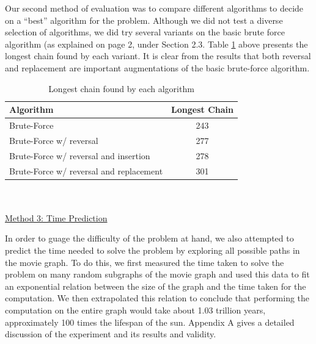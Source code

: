 \documentclass[11pt,english]{article}
\begin{document}
Our second method of evaluation was to compare different algorithms to
decide on a ``best'' algorithm for the problem. Although we did not test a
diverse selection of algorithms, we did try several variants on the basic
brute force algorithm (as explained on page 2, under Section 2.3. Table
\ref{tab:algos} above presents the longest chain found by each variant. It is
clear from the results that both reversal and replacement are important
augmentations of the basic brute-force algorithm.
\begin{table}
\centering
\begin{tabular}{l|c}
Algorithm                               & Longest Chain \\
\hline
Brute-Force                             & 243           \\
Brute-Force w/ reversal                 & 277           \\
Brute-Force w/ reversal and insertion   & 278           \\
Brute-Force w/ reversal and replacement & 301           \\
\end{tabular}
\caption{Longest chain found by each algorithm}
\vspace{-4mm}
\label{tab:algos}
\end{table}
\\\\
\underline{Method 3: Time Prediction}

In order to guage the difficulty of the problem at hand, we also attempted to
predict the time needed to solve the problem by exploring all possible paths
in the movie graph. To do this, we first measured the time taken to solve the
problem on many random subgraphs of the movie graph and used this data to fit
an exponential relation between the size of the graph and the time taken for
the computation. We then extrapolated this relation to conclude that performing
the computation on the entire graph would take about 1.03 trillion years,
approximately 100 times the lifespan of the sun. Appendix A gives a detailed
discussion of the experiment and its results and validity.
\end{document}
